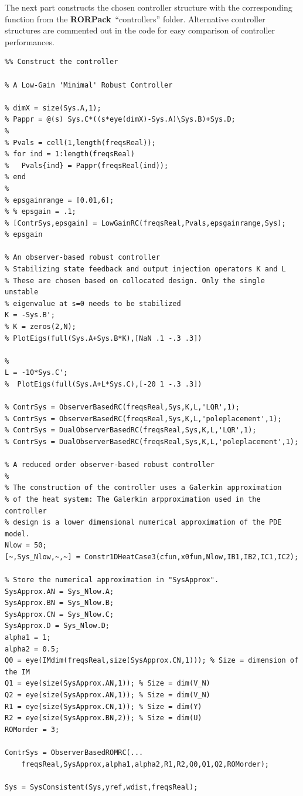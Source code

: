 \documentclass[11pt, a4paper]{amsart}
\theoremstyle{definition}
\numberwithin{equation}{section}
\newcommand{\RORname}{\textbf{RORPack}}
\begin{document}
The next part constructs the chosen controller structure with the corresponding function from the \RORname\ ``controllers'' folder. Alternative controller structures are commented out in the code for easy comparison of controller performances.

\begin{lstlisting} 
%% Construct the controller

% A Low-Gain 'Minimal' Robust Controller

% dimX = size(Sys.A,1);
% Pappr = @(s) Sys.C*((s*eye(dimX)-Sys.A)\Sys.B)+Sys.D;
% 
% Pvals = cell(1,length(freqsReal));
% for ind = 1:length(freqsReal)
%   Pvals{ind} = Pappr(freqsReal(ind));
% end
% 
% epsgainrange = [0.01,6];
% % epsgain = .1;
% [ContrSys,epsgain] = LowGainRC(freqsReal,Pvals,epsgainrange,Sys);
% epsgain

% An observer-based robust controller
% Stabilizing state feedback and output injection operators K and L
% These are chosen based on collocated design. Only the single unstable
% eigenvalue at s=0 needs to be stabilized
K = -Sys.B';
% K = zeros(2,N);
% PlotEigs(full(Sys.A+Sys.B*K),[NaN .1 -.3 .3])

%
L = -10*Sys.C';
%  PlotEigs(full(Sys.A+L*Sys.C),[-20 1 -.3 .3])

% ContrSys = ObserverBasedRC(freqsReal,Sys,K,L,'LQR',1);
% ContrSys = ObserverBasedRC(freqsReal,Sys,K,L,'poleplacement',1);
% ContrSys = DualObserverBasedRC(freqsReal,Sys,K,L,'LQR',1);
% ContrSys = DualObserverBasedRC(freqsReal,Sys,K,L,'poleplacement',1);

% A reduced order observer-based robust controller
%
% The construction of the controller uses a Galerkin approximation
% of the heat system: The Galerkin arpproximation used in the controller
% design is a lower dimensional numerical approximation of the PDE model.
Nlow = 50;
[~,Sys_Nlow,~,~] = Constr1DHeatCase3(cfun,x0fun,Nlow,IB1,IB2,IC1,IC2);

% Store the numerical approximation in "SysApprox".
SysApprox.AN = Sys_Nlow.A;
SysApprox.BN = Sys_Nlow.B;
SysApprox.CN = Sys_Nlow.C;
SysApprox.D = Sys_Nlow.D;
alpha1 = 1;
alpha2 = 0.5;
Q0 = eye(IMdim(freqsReal,size(SysApprox.CN,1))); % Size = dimension of the IM 
Q1 = eye(size(SysApprox.AN,1)); % Size = dim(V_N)
Q2 = eye(size(SysApprox.AN,1)); % Size = dim(V_N)
R1 = eye(size(SysApprox.CN,1)); % Size = dim(Y)
R2 = eye(size(SysApprox.BN,2)); % Size = dim(U)
ROMorder = 3;

ContrSys = ObserverBasedROMRC(...
    freqsReal,SysApprox,alpha1,alpha2,R1,R2,Q0,Q1,Q2,ROMorder);

Sys = SysConsistent(Sys,yref,wdist,freqsReal);
\end{lstlisting}
\end{document}
